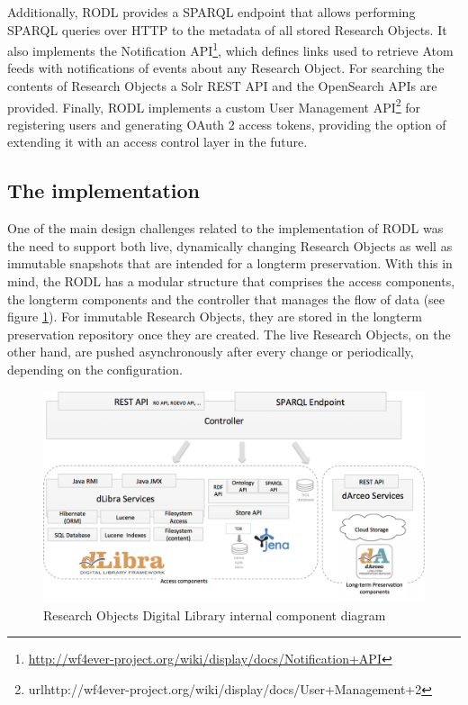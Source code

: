 Additionally, RODL provides a SPARQL endpoint that allows performing SPARQL queries over HTTP to the metadata of all stored Research Objects. It also implements the Notification API\footnote{\url{http://wf4ever-project.org/wiki/display/docs/Notification+API}}, which defines links used to retrieve Atom feeds with notifications of events about any Research Object. For searching the contents of Research Objects a Solr REST API and the OpenSearch APIs are provided. Finally, RODL implements a custom User Management API\footnote{url{http://wf4ever-project.org/wiki/display/docs/User+Management+2}} for registering users and generating OAuth 2 access tokens, providing the option of extending it with an access control layer in the future.



\subsection{The implementation}

One of the main design challenges related to the implementation of RODL was the need to support both live, dynamically changing Research Objects as well as immutable snapshots that are intended for a longterm preservation. With this in mind, the RODL has a modular structure that comprises the access components, the longterm components and the controller that manages the flow of data (see figure \ref{RODL}). For immutable Research Objects, they are stored in the longterm preservation repository once they are created. The live Research Objects, on the other hand, are pushed asynchronously after every change or periodically, depending on the configuration.

\begin{figure}[!hb]
\centering
\includegraphics[width=\textwidth]{Figures/RODL-new.png}
\caption{Research Objects Digital Library internal component diagram}
\label{RODL}
\end{figure}


